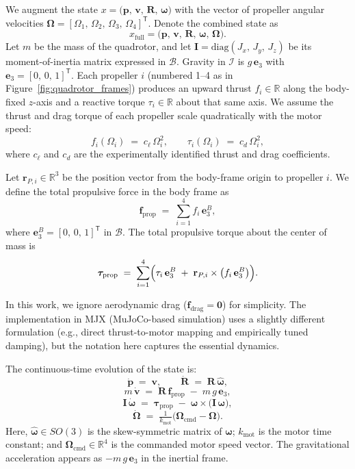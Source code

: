We augment the state \(x = \bigl(\mathbf{p},\,\mathbf{v},\,\mathbf{R},\,\boldsymbol{\omega}\bigr)\) with the vector of propeller angular velocities \(\boldsymbol{\Omega} = [\Omega_{1},\,\Omega_{2},\,\Omega_{3},\,\Omega_{4}]^{\mathsf{T}}\). Denote the combined state as 
\[
x_{\mathrm{full}} = \bigl(\mathbf{p},\,\mathbf{v},\,\mathbf{R},\,\boldsymbol{\omega},\,\boldsymbol{\Omega}\bigr).
\]
Let \(m\) be the mass of the quadrotor, and let \(\mathbf{I} = \mathrm{diag}(J_{x},\,J_{y},\,J_{z})\) be its moment-of-inertia matrix expressed in \(\mathcal{B}\). Gravity in \(\mathcal{I}\) is \(g\,\mathbf{e}_{3}\) with \(\mathbf{e}_{3} = [0,\,0,\,1]^{\mathsf{T}}\). Each propeller \(i\) (numbered 1–4 as in Figure~\ref{fig:quadrotor_frames}) produces an upward thrust \(f_{i} \in \mathbb{R}\) along the body-fixed \(z\)-axis and a reactive torque \(\tau_{i}\in \mathbb{R}\) about that same axis. We assume the thrust and drag torque of each propeller scale quadratically with the motor speed:
\[
f_{i}(\Omega_{i}) \;=\; c_{\ell}\,\Omega_{i}^{2}, 
\qquad 
\tau_{i}(\Omega_{i}) \;=\; c_{d}\,\Omega_{i}^{2},
\]
where \(c_{\ell}\) and \(c_{d}\) are the experimentally identified thrust and drag coefficients.

Let \(\mathbf{r}_{P,i}\in \mathbb{R}^{3}\) be the position vector from the body-frame origin to propeller \(i\). We define the total propulsive force in the body frame as
\[
\mathbf{f}_{\mathrm{prop}} \;=\; \sum_{i=1}^{4} f_{i}\,\mathbf{e}_{3}^{B},
\]
where \(\mathbf{e}_{3}^{B} = [0,\,0,\,1]^{\mathsf{T}}\) in \(\mathcal{B}\). The total propulsive torque about the center of mass is
\[
\boldsymbol{\tau}_{\mathrm{prop}} \;=\; \sum_{i=1}^{4} \Bigl(\tau_{i}\,\mathbf{e}_{3}^{B} \;+\; \mathbf{r}_{P,i} \times \bigl(f_{i}\,\mathbf{e}_{3}^{B}\bigr)\Bigr).
\]

In this work, we ignore aerodynamic drag (\(\mathbf{f}_{\mathrm{drag}} = \mathbf{0}\)) for simplicity. The implementation in MJX (MuJoCo-based simulation) uses a slightly different formulation (e.g., direct thrust-to-motor mapping and empirically tuned damping), but the notation here captures the essential dynamics.

\medskip
The continuous-time evolution of the state is:
\[
\dot{\mathbf{p}} \;=\; \mathbf{v}, 
\qquad
\dot{\mathbf{R}} \;=\; \mathbf{R}\,\widehat{\boldsymbol{\omega}},
\]
\[
m\,\dot{\mathbf{v}} 
\;=\; \mathbf{R}\,\mathbf{f}_{\mathrm{prop}} \;-\; m\,g\,\mathbf{e}_{3},
\]
\[
\mathbf{I}\,\dot{\boldsymbol{\omega}} 
\;=\; \boldsymbol{\tau}_{\mathrm{prop}} \;-\; \boldsymbol{\omega} \times \bigl(\mathbf{I}\,\boldsymbol{\omega}\bigr),
\]
\[
\dot{\boldsymbol{\Omega}} 
\;=\; \tfrac{1}{k_{\mathrm{mot}}}\bigl(\boldsymbol{\Omega}_{\mathrm{cmd}} - \boldsymbol{\Omega}\bigr).
\]
Here, \(\widehat{\boldsymbol{\omega}}\in SO(3)\) is the skew-symmetric matrix of \(\boldsymbol{\omega}\); \(k_{\mathrm{mot}}\) is the motor time constant; and \(\boldsymbol{\Omega}_{\mathrm{cmd}}\in \mathbb{R}^{4}\) is the commanded motor speed vector. The gravitational acceleration appears as \(-m\,g\,\mathbf{e}_{3}\) in the inertial frame.

